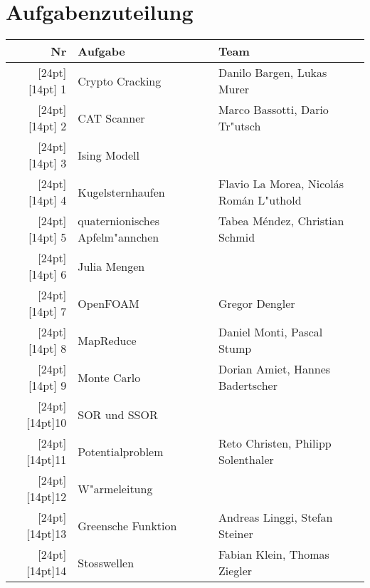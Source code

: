 \documentclass[a4paper,12pt]{article}
\begin{document}
\section{Aufgabenzuteilung}
\def\aufnr#1{\raisebox{0pt}[24pt][14pt]{#1}}
\begin{center}
\begin{tabular}{|r|l|l|}
\hline
Nr&Aufgabe&Team\\
\hline
\aufnr{ 1}&Crypto Cracking                &Danilo Bargen, Lukas Murer\\
\hline
\aufnr{ 2}&CAT Scanner                    &Marco Bassotti, Dario Tr"utsch\\
\hline
\aufnr{ 3}&Ising Modell                   &\\
\hline
\aufnr{ 4}&Kugelsternhaufen               &Flavio La Morea, Nicol\'as Rom\'an L"uthold\\
\hline
\aufnr{ 5}&quaternionisches Apfelm"annchen&Tabea M\'endez, Christian Schmid\\
\hline
\aufnr{ 6}&Julia Mengen                   &\\
\hline
\aufnr{ 7}&OpenFOAM                       &Gregor Dengler\\
\hline
\aufnr{ 8}&MapReduce                      &Daniel Monti, Pascal Stump\\
\hline
\aufnr{ 9}&Monte Carlo                    &Dorian Amiet, Hannes Badertscher\\
\hline
\aufnr{10}&SOR und SSOR                   &\\
\hline
\aufnr{11}&Potentialproblem               &Reto Christen, Philipp Solenthaler\\
\hline
\aufnr{12}&W"armeleitung                  &\\
\hline
\aufnr{13}&Greensche Funktion             &Andreas Linggi, Stefan Steiner\\
\hline
\aufnr{14}&Stosswellen                    &Fabian Klein, Thomas Ziegler\\
\hline
\end{tabular}
\end{center}
\end{document}
